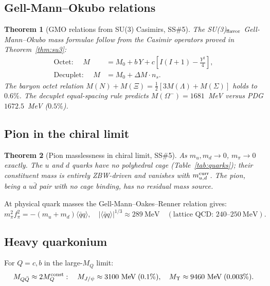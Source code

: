 \documentclass[11pt,letterpaper]{article}
\newtheorem{theorem}{Theorem}[section]
\newcommand{\qqbar}{\langle\bar{q}q\rangle}
\begin{document}
\subsection{Gell-Mann--Okubo relations}

\begin{theorem}[GMO relations from SU(3) Casimirs, SS\#5]
\label{thm:gmo}
The SU(3)$_{\rm flavor}$ Gell-Mann--Okubo mass formulae follow from
the Casimir operators proved in Theorem~\ref{thm:su3}:
\begin{align}
\text{Octet: }\quad
M &= M_0 + b\,Y + c\left[I(I+1) - \tfrac{Y^2}{4}\right],
\label{eq:gmo_o} \\
\text{Decuplet: }\quad
M &= M_0 + \Delta M\cdot n_s.
\label{eq:gmo_d}
\end{align}
The baryon octet relation $M(N)+M(\Xi) = \frac{1}{2}[3M(\Lambda)+M(\Sigma)]$
holds to $0.6\%$.  The decuplet equal-spacing rule predicts
$M(\Omega^-) = 1681$~MeV versus PDG $1672.5$~MeV ($0.5\%$).
\end{theorem}

\subsection{Pion in the chiral limit}

\begin{theorem}[Pion masslessness in chiral limit, SS\#5]
\label{thm:pion}
As $m_u, m_d \to 0$, $m_\pi \to 0$ exactly.  The $u$ and $d$
quarks have no polyhedral cage (Table~\ref{tab:quarks}); their
constituent mass is entirely ZBW-driven and vanishes with
$m_{u,d}^{\rm curr}$.  The pion, being a $u\bar{d}$ pair with
no cage binding, has no residual mass source.
\end{theorem}

At physical quark masses the Gell-Mann--Oakes--Renner relation gives:
\begin{equation}
m_\pi^2 f_\pi^2 = -(m_u+m_d)\qqbar,\quad
|\qqbar|^{1/3} \approx 289\ \text{MeV}
\quad(\text{lattice QCD: }240\text{--}250\ \text{MeV}).
\label{eq:gor}
\end{equation}

\subsection{Heavy quarkonium}

For $Q = c, b$ in the large-$M_Q$ limit:
\begin{equation}
M_{Q\bar{Q}} \approx 2M_Q^{\rm const}:
\quad M_{J/\psi} \approx 3100\ \text{MeV}\; (0.1\%),\quad
M_{\Upsilon} \approx 9460\ \text{MeV}\; (0.003\%).
\label{eq:quarkonium}
\end{equation}
\end{document}
